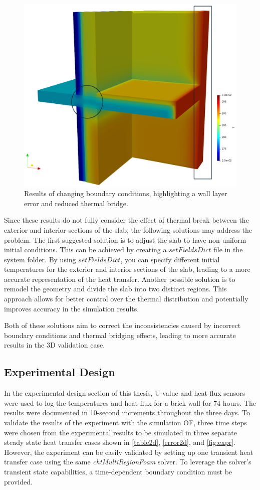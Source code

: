 
\begin{figure}[tb]
\centering
\includegraphics[width=0.75\columnwidth]{Figures/maxx.png}
\hspace{0.7cm}
\caption[Slab Validation]{Results of changing boundary conditions, highlighting a wall layer error and reduced thermal bridge.}
\label{maxx}
\end{figure}

Since these results do not fully consider the effect of thermal break between the exterior and interior sections of the slab, the following solutions may address the problem. The first suggested solution is to adjust the slab to have non-uniform initial conditions. This can be achieved by creating a $setFieldsDict$ file in the system folder. By using $setFieldsDict$, you can specify different initial temperatures for the exterior and interior sections of the slab, leading to a more accurate representation of the heat transfer. Another possible solution is to remodel the geometry and divide the slab into two distinct regions. This approach allows for better control over the thermal distribution and potentially improves accuracy in the simulation results.

Both of these solutions aim to correct the inconsistencies caused by incorrect boundary conditions and thermal bridging effects, leading to more accurate results in the 3D validation case.

\subsection{Experimental Design}
In the experimental design section of this thesis, U-value and heat flux sensors were used to log the temperatures and heat flux for a brick wall for 74 hours. The results were documented in 10-second increments throughout the three days. To validate the results of the experiment with the simulation \gls{OF}, three time steps were chosen from the experimental results to be simulated in three separate steady state heat transfer cases shown in \ref{table2d}, \ref{error2d}, and \ref{fig:expr}. However, the experiment can be easily validated by setting up one transient heat transfer case using the same \textit{chtMultiRegionFoam} solver. To leverage the solver's transient state capabilities, a time-dependent boundary condition must be provided. 


